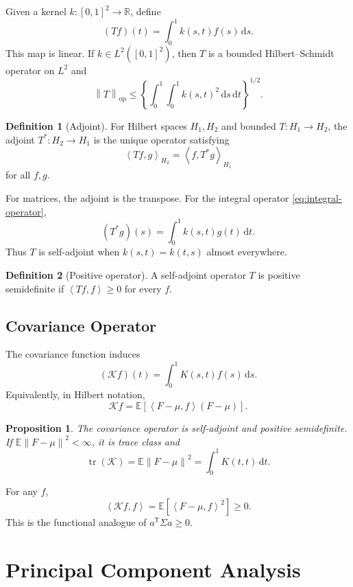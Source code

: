 \documentclass[12pt,oneside]{book}
\numberwithin{equation}{section}
\theoremstyle{definition}
\newtheorem{definition}{Definition}[section]
\theoremstyle{plain}
\newtheorem{proposition}{Proposition}[section]
\theoremstyle{remark}
\newcommand{\R}{\mathbb{R}}
\newcommand{\E}{\mathbb{E}}
\newcommand{\norm}[1]{\left\lVert #1 \right\rVert}
\newcommand{\inner}[2]{\left\langle #1, #2 \right\rangle}
\newcommand{\dd}{\,\mathrm{d}}
\newcommand{\tr}{\operatorname{tr}}
\begin{document}
Given a kernel $k:[0,1]^2\to\R$, define
\begin{equation}
    (Tf)(t)=\int_0^1k(s,t)f(s)\dd s.
    \label{eq:integral-operator}
\end{equation}
This map is linear. If $k\in L^2([0,1]^2)$, then $T$ is a bounded
Hilbert--Schmidt operator on $L^2$ and
\[
    \norm T_{\mathrm{op}}\leq
    \left\{\int_0^1\int_0^1k(s,t)^2\dd s\dd t\right\}^{1/2}.
\]

\begin{definition}[Adjoint]
For Hilbert spaces $H_1,H_2$ and bounded $T:H_1\to H_2$, the adjoint
$T^*:H_2\to H_1$ is the unique operator satisfying
\[
    \inner{Tf}{g}_{H_2}=\inner f{T^*g}_{H_1}
\]
for all $f,g$.
\end{definition}

For matrices, the adjoint is the transpose. For the integral operator
\eqref{eq:integral-operator},
\[
    (T^*g)(s)=\int_0^1k(s,t)g(t)\dd t.
\]
Thus $T$ is self-adjoint when $k(s,t)=k(t,s)$ almost everywhere.

\begin{definition}[Positive operator]
A self-adjoint operator $T$ is positive semidefinite if
$\inner{Tf}{f}\geq0$ for every $f$.
\end{definition}

\subsection{Covariance Operator}

The covariance function induces
\begin{equation}
    (\mathcal Kf)(t)=\int_0^1K(s,t)f(s)\dd s.
    \label{eq:covariance-operator}
\end{equation}
Equivalently, in Hilbert notation,
\[
    \mathcal Kf
    =\E[\inner{F-\mu}{f}(F-\mu)].
\]

\begin{proposition}
The covariance operator is self-adjoint and positive semidefinite. If
$\E\norm{F-\mu}^2<\infty$, it is trace class and
\[
    \tr(\mathcal K)=\E\norm{F-\mu}^2
                  =\int_0^1K(t,t)\dd t.
\]
\end{proposition}

For any $f$,
\[
 \inner{\mathcal Kf}{f}
 =\E[\inner{F-\mu}{f}^2]\geq0.
\]
This is the functional analogue of $a^\mathsf T\Sigma a\geq0$.

\section{Principal Component Analysis}
\end{document}
